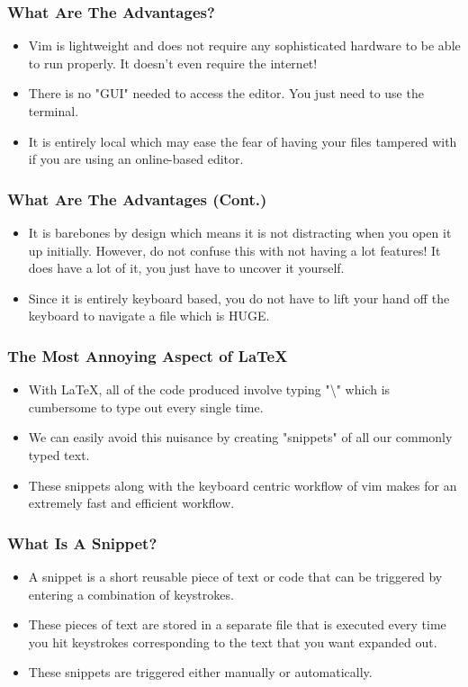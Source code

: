 \documentclass{beamer}
\begin{document}
\begin{frame}
    \frametitle{What Are The Advantages?}
    \begin{itemize}
        \item Vim is lightweight and does not require any sophisticated hardware to be able to run properly. It doesn't even require the internet!   
        \item There is no "GUI" needed to access the editor. You just need to use the terminal.
        \item It is entirely local which may ease the fear of having your files tampered with if you are using an online-based editor.
    \end{itemize}
\end{frame}

\begin{frame}
    \frametitle{What Are The Advantages (Cont.)}
    \begin{itemize}
        \item It is barebones by design which means it is not distracting when you open it up initially. However, do not confuse this with not having a lot features! It does have a lot of it, you just have to uncover it yourself.
        \item Since it is entirely keyboard based, you do not have to lift your hand off the keyboard to navigate a file which is HUGE. 
        \end{itemize}
\end{frame}

\begin{frame}
    \frametitle{The Most Annoying Aspect of \LaTeX} 
    \begin{itemize}
        \item With \LaTeX, all of the code produced involve typing "\textbackslash" which is cumbersome to type out every single time.
        \item We can easily avoid this nuisance by creating "snippets" of all our commonly typed text. 
        \item These snippets along with the keyboard centric workflow of vim makes for an extremely fast and efficient workflow.
    \end{itemize}     

\end{frame}
\begin{frame}
    \frametitle{What Is A Snippet?}
    \begin{itemize}
        \item A snippet is a short reusable piece of text or code that can be triggered by entering a combination of keystrokes.
        \item These pieces of text are stored in a separate file that is executed every time you hit keystrokes corresponding to the text that you want expanded out.
        \item These snippets are triggered either manually or automatically.
    \end{itemize}
\end{frame}
\end{document}
